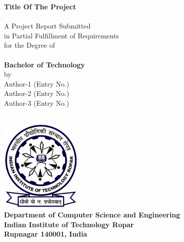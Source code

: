 \begin{titlepage}
\begin{center}

{\Huge \bfseries
Title Of The Project\\
}~\\[1cm]


{\large
A Project Report Submitted\\
in Partial Fulfillment of Requirements\\
for the Degree of\\
}~\\[0.20cm]

{\Large \bfseries
Bachelor of Technology
}\\[1.75cm]

{\large
by\\
Author-1 (Entry No.)\\
Author-2 (Entry No.)\\
Author-3 (Entry No.)\\
}~\\[1cm]

\vfill

\includegraphics[width=4cm]{figures/IITRopar-Logo.jpg}~\\[1cm]

{\large \bfseries
Department of Computer Science and Engineering\\
Indian Institute of Technology Ropar\\
Rupnagar 140001, India\\
}

\end{center}
\end{titlepage}
